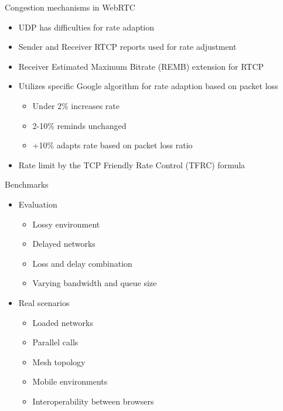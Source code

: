 \documentclass[first=red,second=purple,logo=yellowexc]{aaltoslides}
\begin{document}
\begin{frame}{Congestion mechanisms in WebRTC}

\begin{itemize}
\item UDP has difficulties for rate adaption 
\item Sender and Receiver RTCP reports used for rate adjustment
\item Receiver Estimated Maximum Bitrate (REMB) extension for RTCP
\item Utilizes specific {\color{red}Google algorithm} for rate adaption based on packet loss
\begin{itemize}
\item Under 2\% increases rate
\item 2-10\% reminds unchanged
\item +10\% adapts rate based on packet loss ratio
\end{itemize}
\item Rate limit by the TCP Friendly Rate Control (TFRC) formula
\end{itemize}
\end{frame}

\begin{frame}{Benchmarks}

\begin{itemize}
\item Evaluation
\begin{itemize}
\item Lossy environment
\item Delayed networks
\item Loss and delay combination
\item Varying bandwidth and queue size
\end{itemize}

\item Real scenarios
\begin{itemize}
\item Loaded networks
\item Parallel calls
\item Mesh topology
\item Mobile environments
\item Interoperability between browsers
\end{itemize}

\end{itemize}

\end{frame}
\end{document}
